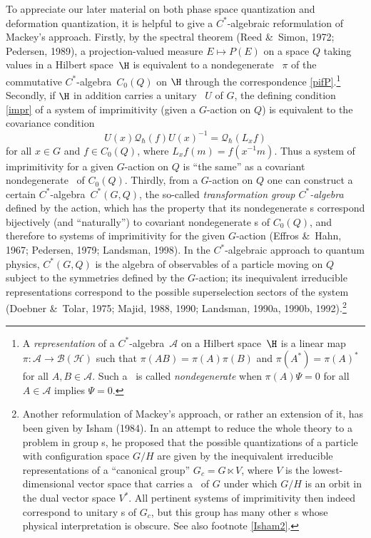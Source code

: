 \documentclass[12pt,titlepage]{article}
\newcommand{\beq}{\begin{equation}}
\newcommand{\eeq}{\end{equation}}
\newcommand{\ca}{$C^*$-algebra} \newcommand{\jba}{JB-algebra}
\newcommand{\irrep}{irreducible representation}
\newcommand{\Hs}{Hilbert space} \newcommand{\Bs}{Banach space}
\newcommand{\raw}{\rightarrow} \newcommand{\rat}{\mapsto}
\newcommand{\BH}{\mathcal{B}({\mathcal H})} \newcommand{\diri}{\int^{\oplus}}
\newcommand{\qh}{q_{\hbar}} \newcommand{\sgh}{\sigma_{\hbar}}
\newcommand{\inv}{^{-1}} \newcommand{\sa}{_{\R}}
\newcommand{\er}{\eqref}
\newcommand{\CA}{{\mathcal A}} \newcommand{\CB}{{\mathcal B}}
\newcommand{\CQ}{{\mathcal Q}} \newcommand{\CR}{{\mathcal R}}
\renewcommand{\qh}{\CQ_{\hbar}}
\begin{document}
To appreciate our later material on both  phase space quantization and deformation quantization, it is helpful to give a \ca ic reformulation of Mackey's approach. Firstly, by the spectral theorem (Reed \&\ Simon, 1972; Pedersen, 1989), a projection-valued measure $E\mapsto P(E)$ on a space $Q$ taking values in a \Hs\ $\H$ is equivalent to a nondegenerate \rep\ $\pi$ of the commutative \ca\ $C_0(Q)$ on $\H$ through the correspondence \er{pifP}.\footnote{A  {\it representation} of a \ca\ $\CA$ on a \Hs\ $\H$ is a linear map $\pi:\CA\raw\BH$ such that $\pi(AB)=\pi(A)\pi(B)$ and
$\pi(A^*)=\pi(A)^*$ for all $A,B\in\CA$. 
Such a  \rep\ is called {\it nondegenerate} when $\pi(A)\Psi =0$ for all $A\in\CA$ implies $\Psi=0$.} Secondly, if $\H$ in addition carries a unitary \rep\ $U$ of $G$, the defining condition \er{impr} of a system of imprimitivity (given a $G$-action on $Q$) is equivalent to the covariance condition \beq U(x)\qh(f)U(x)\inv=\qh(L_xf) \label{Gcov}\eeq
 for all $x\in G$ and $f\in C_0(Q)$, where $L_xf (m)=f(x\inv m)$.  Thus a  system of imprimitivity for a given $G$-action on $Q$ is ``the same'' as a covariant nondegenerate \rep\ of $C_0(Q)$. Thirdly, from a $G$-action on $Q$ one can construct a certain \ca\ $C^*(G,Q)$, the so-called {\it transformation group \ca} defined by the action,
which has the property that its nondegenerate \rep s correspond bijectively (and ``naturally'') to covariant nondegenerate \rep s of $C_0(Q)$, and therefore to systems of imprimitivity for the given $G$-action (Effros \&\  Hahn, 1967; Pedersen, 1979; Landsman, 1998).  In the \ca ic approach to quantum physics, $C^*(G,Q)$ is
the algebra of observables of a particle moving on $Q$ subject to the symmetries defined by the $G$-action; its inequivalent \irrep s correspond to the possible superselection sectors of the system (Doebner \&\  Tolar, 1975; Majid, 1988, 1990; Landsman, 1990a, 1990b, 1992).\footnote{Another reformulation of Mackey's approach, or rather an extension of it, has been given by Isham (1984). In an attempt to reduce the whole theory 
to a problem in group \rep s, he proposed that the possible quantizations of a particle 
with configuration space $G/H$ are given by the inequivalent \irrep s of a ``canonical group'' $G_c=G\ltimes V$, where $V$ is the lowest-dimensional vector space that carries a \rep\ of $G$ under which $G/H$ is an orbit in the dual vector space  $V^*$. All pertinent systems of imprimitivity then indeed correspond to unitary \rep s of $G_c$, but this group has many other \rep s whose physical interpretation is obscure. See also footnote \ref{Isham2}.\label{Isham1}}
\end{document}
